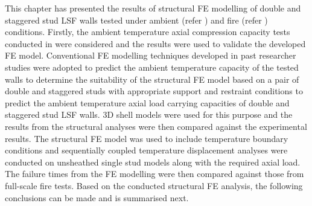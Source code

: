 This chapter has presented the results of structural FE modelling of double and staggered stud LSF walls tested under ambient (refer ) and fire (refer ) conditions. Firstly, the ambient temperature axial compression capacity tests conducted in  were considered and the results were used to validate the developed FE model. Conventional FE modelling techniques developed in past researcher studies were adopted to predict the ambient temperature capacity of the tested walls to determine the suitability of the structural FE model based on a pair of double and staggered studs with appropriate support and restraint conditions to predict the ambient temperature axial load carrying capacities of double and staggered stud LSF walls. 3D shell models were used for this purpose and the results from the structural analyses were then compared against the experimental results. The structural FE model was used to include temperature boundary conditions and sequentially coupled temperature displacement analyses were conducted on unsheathed single stud models along with the required axial load. The failure times from the FE modelling were then compared against those from full-scale fire tests. Based on the conducted structural FE analysis, the following conclusions can be made and is summarised next.
